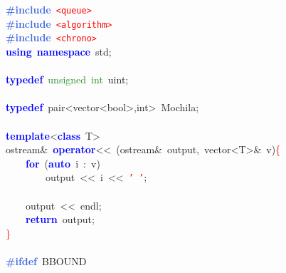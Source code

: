 \mbox{}\textbf{\textcolor{RoyalBlue}{\#include}}\ \texttt{\textcolor{Red}{\textless{}queue\textgreater{}}} \\
\mbox{}\textbf{\textcolor{RoyalBlue}{\#include}}\ \texttt{\textcolor{Red}{\textless{}algorithm\textgreater{}}} \\
\mbox{}\textbf{\textcolor{RoyalBlue}{\#include}}\ \texttt{\textcolor{Red}{\textless{}chrono\textgreater{}}} \\
\mbox{}\textbf{\textcolor{Blue}{using}}\ \textbf{\textcolor{Blue}{namespace}}\ std\textcolor{BrickRed}{;} \\
\mbox{} \\
\mbox{}\textbf{\textcolor{Blue}{typedef}}\ \textcolor{ForestGreen}{unsigned}\ \textcolor{ForestGreen}{int}\ uint\textcolor{BrickRed}{;} \\
\mbox{} \\
\mbox{}\textbf{\textcolor{Blue}{typedef}}\ \textcolor{TealBlue}{pair\textless{}vector\textless{}bool\textgreater{},int\textgreater{}}\ Mochila\textcolor{BrickRed}{;} \\
\mbox{} \\
\mbox{}\textbf{\textcolor{Blue}{template}}\textcolor{BrickRed}{\textless{}}\textbf{\textcolor{Blue}{class}}\ \textcolor{TealBlue}{T}\textcolor{BrickRed}{\textgreater{}} \\
\mbox{}ostream\textcolor{BrickRed}{\&}\ \textbf{\textcolor{Blue}{operator}}\textcolor{BrickRed}{\textless{}\textless{}}\ \textcolor{BrickRed}{(}ostream\textcolor{BrickRed}{\&}\ output\textcolor{BrickRed}{,}\ vector\textcolor{BrickRed}{\textless{}}T\textcolor{BrickRed}{\textgreater{}\&}\ v\textcolor{BrickRed}{)}\textcolor{Red}{\{} \\
\mbox{}\ \ \ \ \textbf{\textcolor{Blue}{for}}\ \textcolor{BrickRed}{(}\textbf{\textcolor{Blue}{auto}}\ i\ \textcolor{BrickRed}{:}\ v\textcolor{BrickRed}{)} \\
\mbox{}\ \ \ \ \ \ \ \ output\ \textcolor{BrickRed}{\textless{}\textless{}}\ i\ \textcolor{BrickRed}{\textless{}\textless{}}\ \texttt{\textcolor{Red}{'\ '}}\textcolor{BrickRed}{;} \\
\mbox{}\ \ \ \  \\
\mbox{}\ \ \ \ output\ \textcolor{BrickRed}{\textless{}\textless{}}\ endl\textcolor{BrickRed}{;} \\
\mbox{}\ \ \ \ \textbf{\textcolor{Blue}{return}}\ output\textcolor{BrickRed}{;} \\
\mbox{}\textcolor{Red}{\}} \\
\mbox{} \\
\mbox{}\textbf{\textcolor{RoyalBlue}{\#ifdef}}\ BBOUND \\

